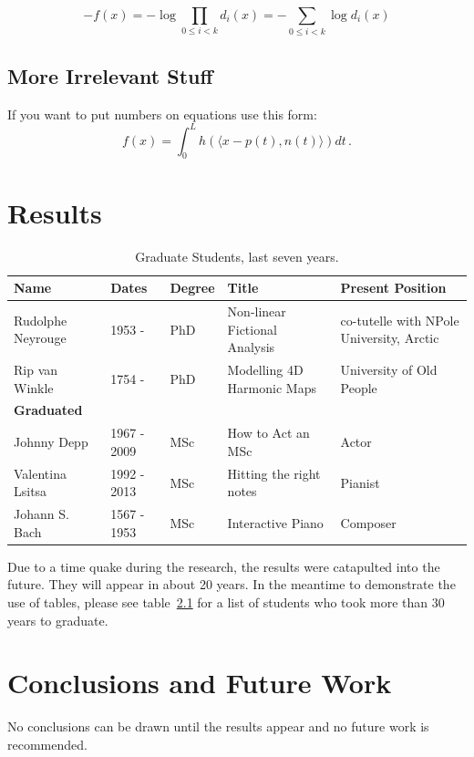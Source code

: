 \documentclass[11pt]{report}
\begin{document}
\[
-f(x) = - \log \prod_{0\leq i<k}d_i(x) = - \sum_{0\leq i<k} \log d_i(x)
\]


\section{More Irrelevant Stuff}
If you want to put numbers on equations use this form:
\begin{equation}
\label{integralrep}
f(x)=\int_0^L h( \langle x-p(t),n(t) \rangle ) dt\,.
\end{equation}



\chapter{Results}
\begin{table}[tbp]
\begin{tabular}{||l|l|l|p{1.5in}|p{1.2in}||}
\hline
\hline
Name & Dates & Degree & Title & Present Position \\
\hline
Rudolphe Neyrouge & 1953  - & PhD &  Non-linear Fictional Analysis &  co-tutelle with NPole University, Arctic \\
Rip van Winkle & 1754 -  & PhD & Modelling 4D Harmonic Maps & University of Old People \\

\hline
{\bf Graduated} &&&& \\
\hline
Johnny Depp & 1967 - 2009 & MSc & How to Act an MSc & Actor \\
Valentina Lsitsa & 1992 - 2013 & MSc & Hitting the right notes &  Pianist  \\
Johann S. Bach & 1567 - 1953 & MSc & Interactive Piano  & Composer \\\hline
\hline
\end{tabular}
\caption{\label{stud-table} Graduate Students, last seven years.}
\end{table}

Due to a time quake during the research, the results were catapulted into the future.  They will appear in about 20 years.
In the meantime to demonstrate the use of tables, please see table~\ref{stud-table} for a list of students who took more than 30 years to graduate.

\chapter{Conclusions and Future Work}
No conclusions can be drawn until the results appear and no future work is recommended.




\end{document}
